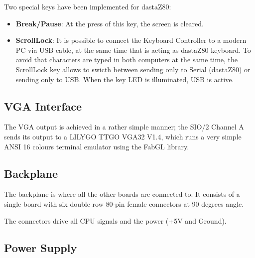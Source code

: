 \documentclass[a4paper,11pt]{article}
\begin{document}
    Two special keys have been implemented for dastaZ80:

    \begin{itemize}
        \item \textbf{Break/Pause}: At the press of this key, the screen is
        cleared.
        \item \textbf{ScrollLock}: It is possible to connect the Keyboard
        Controller to a modern PC via USB cable, at the same time that is acting
        as dastaZ80 keyboard. To avoid that characters are typed in both
        computers at the same time, the ScrollLock key allows to swicth between
        sending only to Serial (dastaZ80) or sending only to USB. When the key
        LED is illuminated, USB is active.
    \end{itemize}


    \subsection{VGA Interface}

    The VGA output is achieved in a rather simple manner; the SIO/2 Channel A
    sends its output to a LILYGO TTGO VGA32 V1.4, which runs a very simple ANSI
    16 colours terminal emulator using the FabGL library.


    \subsection{Backplane}

    The backplane is where all the other boards are connected to. It consists
    of a single board with six double row 80-pin female connectors at 90 degrees
    angle.

    The connectors drive all CPU signals and the power (+5V and Ground).

    \subsection{Power Supply}
\end{document}
